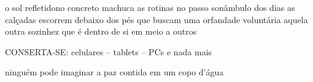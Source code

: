 \begin{poem}
\begin{stanza}
o sol refletidono concreto\verseline
machuca as rotinas\verseline
no passo sonâmbulo dos dias\verseline
as calçadas escorrem\verseline
debaixo dos pés que buscam\verseline
uma orfandade voluntária\verseline
aquela outra sozinhez\verseline
que é dentro de si\verseline
em meio a outros
\end{stanza}
\begin{stanza}
\qquad CONSERTA-SE:\verseline
\qquad celulares – tablets – PCs\verseline
e nada mais
\end{stanza}
\begin{stanza}
ninguém pode imaginar a paz\verseline
contida em um copo d'água
\end{stanza}
\end{poem}